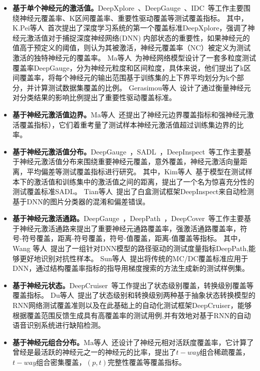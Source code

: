 \begin{itemize}
	\item \textbf{基于单个神经元的激活值。}DeepXplore~、DeepGauge~、IDC~等工作主要围绕神经元覆盖率、K区间覆盖率、重要性驱动覆盖等测试覆盖指标。
	      其中，K.Pei等人~首次提出了深度学习系统的第一个覆盖标准DeepXplore，强调了神经元激活值对于捕捉深度神经网络(DNN) 内部状态的重要性，如果神经元的值高于预定义的阈值，则认为其被激活，神经元覆盖率（NC）被定义为测试激活的独特神经元的覆盖率。
	      Ma等人~为神经网络模型设计了一套多粒度测试覆盖率DeepGauge，分为神经元粒度和区间粒度，具体来说，他们提出了k区间覆盖率，将每个神经元的输出范围基于训练集的上下界平均划分为k个部分，并计算测试数据集覆盖的比例。
	      Gerasimou等人~设计了通过衡量神经元对分类结果的影响比例提出了重要性驱动覆盖标准。

	\item \textbf{基于神经元激活值边界。}Ma等人~还提出了神经元边界覆盖指标和强神经元激活覆盖指标），它们着重考量了测试样本神经元激活值超过训练集边界的比率。

	\item \textbf{基于神经元激活值分布。}DeepGauge~，SADL~，DeepInspect~等工作主要基于神经元激活值分布来围绕重要神经元覆盖，意外覆盖，神经元激活向量距离，平均偏差等测试覆盖指标进行研究。
	      其中，Kim等人~基于模型在测试样本下的激活值和训练集中的激活值之间的距离，提出了一个名为惊喜充分性的测试覆盖标准SADL。
	      Tian等人~提出了白盒测试框架DeepInspect来自动检测基于DNN的图片分类器的混淆和偏差错误。

	\item \textbf{基于神经元激活通路。}DeepGauge~，DeepPath~，DeepCover~等工作主要基于神经元激活通路来提出了重要神经元通路覆盖率，强激活通路覆盖率，符号-符号覆盖，距离-符号覆盖，符号-值覆盖，距离-值覆盖等指标。
	      其中，Wang 等人~提出了一组针对DNN模型的路径驱动的测试度量指标DeepPath,能够更好地识别对抗性样本。
	      Sun等人~提出将传统的MC/DC覆盖标准应用于DNN，通过结构覆盖率指标的指导用梯度搜索的方法生成新的测试样例集。

	\item \textbf{基于神经元状态。}DeepCruiser~等工作提出了状态级别覆盖，转换级别覆盖等覆盖指标。
	      Du等人~提出了状态级别和转换级别两种基于抽象状态转换模型的RNN网络测试覆盖准则以及在此基础上的自动化测试框架DeepCruiser，能够根据覆盖范围反馈生成具有高覆盖率的测试用例,并有效地对基于RNN的自动语音识别系统进行缺陷检测。

	\item \textbf{基于神经元组合分布。}Ma等人~还设计了神经元相对活跃度覆盖率，它计算了曾经是最活跃的神经元之一的神经元的比率，提出了$t-way$组合稀疏覆盖，$t-way$组合密集覆盖，$(p,t)$完整性覆盖等覆盖指标。
\end{itemize}


